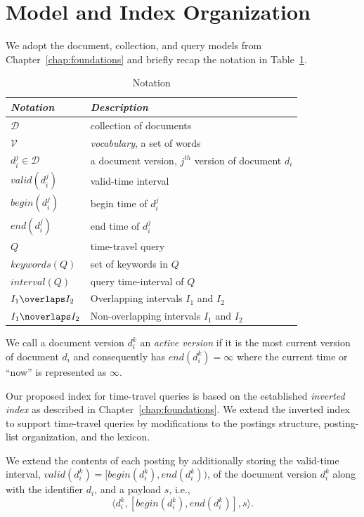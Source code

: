 \section{Model and Index Organization}
\label{chap:sharding:sec:model}


We adopt the document, collection, and query models from Chapter~\ref{chap:foundations} and briefly recap the notation in Table~\ref{tab:sharding_notation}.

\begin{table}
\centering
\begin{tabular}{ll}
\hline  
\multicolumn{1}{l}{\emph{Notation}} &  \multicolumn{1}{l}{\emph{Description}} \\
\hline
$\mathcal{D}$ & collection of documents\\
$\mathcal{V}$ & \emph{vocabulary}, a set of words\\
$d_i^j \in \mathcal{D}$ & a document version, $j^{th}$ version of document $d_i$\\
$valid(d_i^j)$ & valid-time interval \\ 
$begin(d_i^j)$ & begin time of $d_i^j$  \\
$end(d_i^j)$ & end time of $d_i^j$ \\
$Q$ & time-travel query\\
$keywords(Q)$ & set of keywords in $Q$\\
$interval(Q)$ & query time-interval of $Q$\\
$I_1 \overlaps I_2$ & Overlapping intervals $I_1$ and $I_2$ \\
$I_1 \noverlaps I_2$ & Non-overlapping intervals $I_1$ and $I_2$ \\
\hline
\end{tabular}
\caption{Notation}
\label{tab:sharding_notation}
\end{table}

We call a document version $d_i^k$ an \emph{active version} if it is the most current version of document $d_i$ and consequently has $end(d_i^k) = \infty$ where the current time or ``now'' is represented as $\infty$. 

Our proposed index for time-travel queries is based on the
established \emph{inverted index} as described in Chapter~\ref{chap:foundations}. We extend the inverted index to support 
time-travel queries by modifications to the postings structure, 
posting-list organization, and the lexicon. 


We extend the contents of each posting by additionally storing the valid-time 
interval, $valid(d_i^k) = [begin(d_i^k), end(d_i^k))$, of the document version $d_i^{k}$
along with the identifier $d_i$, and a payload $s$, i.e.,
$$\langle d_i^k, [ begin(d_i^k), end(d_i^k)], s\rangle.$$


